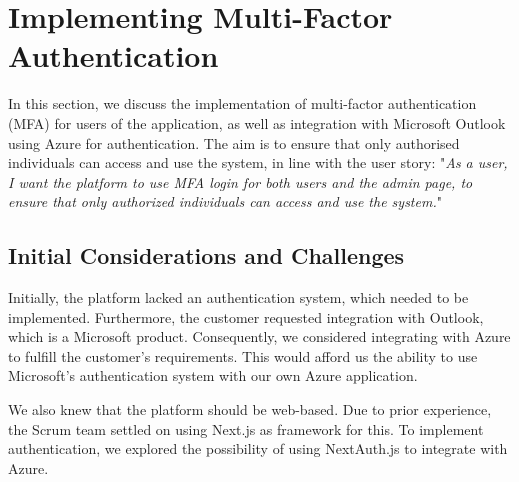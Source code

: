 \section{Implementing Multi-Factor Authentication}
In this section, we discuss the implementation of multi-factor authentication (MFA)\cite{multifactor} for users of the application, as well as integration with Microsoft Outlook\cite{microsoftOutlook} using Azure\cite{azure} for authentication.
The aim is to ensure that only authorised individuals can access and use the system, in line with the user story: "\textit{As a user, I want the platform to use MFA login for both users and the admin page, to ensure that only authorized individuals can access and use the system.}"

\subsection*{Initial Considerations and Challenges}
Initially, the platform lacked an authentication system, which needed to be implemented.
Furthermore, the customer requested integration with Outlook, which is a Microsoft product\cite{microsoftOutlook}.
Consequently, we considered integrating with Azure to fulfill the customer's requirements.
This would afford us the ability to use Microsoft's authentication system with our own Azure application.

We also knew that the platform should be web-based.
Due to prior experience, the Scrum team settled on using Next.js\cite{nextjs} as framework for this.
To implement authentication, we explored the possibility of using NextAuth.js\cite{nextAuth} to integrate with Azure.

